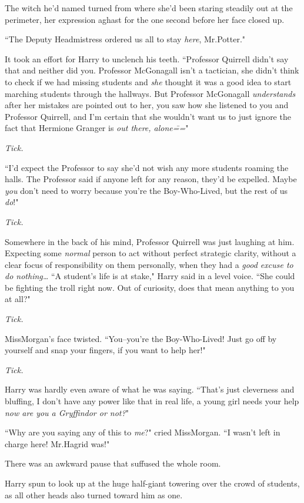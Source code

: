 The witch he'd named turned from where she'd been staring steadily out at the perimeter, her expression aghast for the one second before her face closed up.

``The Deputy Headmistress ordered us all to stay \emph{here}, Mr.\?Potter."

It took an effort for Harry to unclench his teeth. ``Professor Quirrell didn't say that and neither did you. Professor McGonagall isn't a tactician, she didn't think to check if we had missing students and \emph{she} thought it was a good idea to start marching students through the hallways. But Professor McGonagall \emph{understands} after her mistakes are pointed out to her, you saw how she listened to you and Professor Quirrell, and I'm certain that she wouldn't want us to just ignore the fact that Hermione Granger is \emph{out there, alone\===}"

\emph{Tick.}

``I'd expect the Professor to say she'd not wish any more students roaming the halls. The Professor said if anyone left for any reason, they'd be expelled. Maybe \emph{you} don't need to worry because you're the Boy-Who-Lived, but the rest of us \emph{do}!"

\emph{Tick.}

Somewhere in the back of his mind, Professor Quirrell was just laughing at him. Expecting some \emph{normal} person to act without perfect strategic clarity, without a clear focus of responsibility on them personally, when they had a \emph{good excuse to do nothing{\ldots}} ``A student's life is at stake," Harry said in a level voice. ``She could be fighting the troll right now. Out of curiosity, does that mean anything to you at all?"

\emph{Tick.}

Miss\?Morgan's face twisted. ``You\---you're the Boy-Who-Lived! Just go off by yourself and snap your fingers, if you want to help her!"

\emph{Tick.}

Harry was hardly even aware of what he was saying. ``That's just cleverness and bluffing, I don't have any power like that in real life, a young girl needs your help \emph{now are you a Gryffindor or not?}"

``Why are you saying any of this to \emph{me}?" cried Miss\?Morgan. ``I wasn't left in charge here! Mr.\?Hagrid was!"

There was an awkward pause that suffused the whole room.

Harry spun to look up at the huge half-giant towering over the crowd of students, as all other heads also turned toward him as one.

